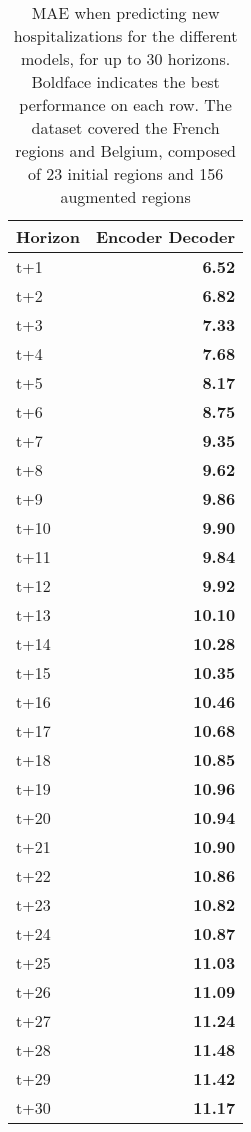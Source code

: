 \begin{table}[H]
\centering
\caption{MAE when predicting new hospitalizations for the different models, for up to 30 horizons. Boldface indicates the best performance on each row. The dataset covered the French regions and Belgium, composed of 23 initial regions and 156 augmented regions }
\label{tab:MAE_comparison}
\begin{tabular}{lr}
\toprule
Horizon &  Encoder Decoder \\
\midrule
t+1  & \textbf{6.52}  \\
t+2  & \textbf{6.82}  \\
t+3  & \textbf{7.33}  \\
t+4  & \textbf{7.68}  \\
t+5  & \textbf{8.17}  \\
t+6  & \textbf{8.75}  \\
t+7  & \textbf{9.35}  \\
t+8  & \textbf{9.62}  \\
t+9  & \textbf{9.86}  \\
t+10  & \textbf{9.90}  \\
t+11  & \textbf{9.84}  \\
t+12  & \textbf{9.92}  \\
t+13  & \textbf{10.10}  \\
t+14  & \textbf{10.28}  \\
t+15  & \textbf{10.35}  \\
t+16  & \textbf{10.46}  \\
t+17  & \textbf{10.68}  \\
t+18  & \textbf{10.85}  \\
t+19  & \textbf{10.96}  \\
t+20  & \textbf{10.94}  \\
t+21  & \textbf{10.90}  \\
t+22  & \textbf{10.86}  \\
t+23  & \textbf{10.82}  \\
t+24  & \textbf{10.87}  \\
t+25  & \textbf{11.03}  \\
t+26  & \textbf{11.09}  \\
t+27  & \textbf{11.24}  \\
t+28  & \textbf{11.48}  \\
t+29  & \textbf{11.42}  \\
t+30  & \textbf{11.17}  \\

\bottomrule
\end{tabular}
\end{table}
